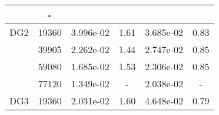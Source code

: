 \begin{table}
\begin{center}
{\begin{tabular}{| l | c | c | c | c | c |}
                &-\\
                \hline
        \hline
        \hspace{0.1cm}DG2\hspace{0.1cm}    
        
            &19360
            
                &3.996e-02
                
                &1.61
                
                &3.685e-02
                
                &0.83\\
                
            &39905
            
                &2.262e-02
                
                &1.44
                
                &2.747e-02
                
                &0.85\\
                
            &59080
            
                &1.685e-02
                
                &1.53
                
                &2.306e-02
                
                &0.85\\
                
            &77120
            
                &1.349e-02
                
                &-
                
                &2.038e-02
                
                &-\\
                \hline
        \hline
        \hspace{0.1cm}DG3\hspace{0.1cm}    
        
            &19360
            
                &2.031e-02
                
                &1.60
                
                &4.648e-02
                
                &0.79\\
                

\end{tabular}}
\end{center}
\end{table}

